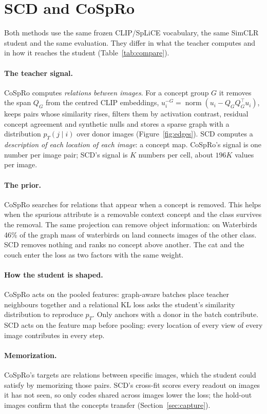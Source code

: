 \documentclass{article}
\begin{document}
\section{SCD and CoSpRo}
\label{sec:cospro}
Both methods use the same frozen CLIP/SpLiCE vocabulary, the same SimCLR student and the same evaluation. They differ in what the teacher computes and in how it reaches the student (Table~\ref{tab:compare}).

\paragraph{The teacher signal.} CoSpRo computes \emph{relations between images}. For a concept group $G$ it removes the span $Q_G$ from the centred CLIP embeddings, $u_i^{-G}=\operatorname{norm}(u_i-Q_GQ_G^\top u_i)$, keeps pairs whose similarity rises, filters them by activation contrast, residual concept agreement and synthetic nulls and stores a sparse graph with a distribution $p_T(j\mid i)$ over donor images (Figure~\ref{fig:edges}). SCD computes a \emph{description of each location of each image}: a concept map. CoSpRo's signal is one number per image pair; SCD's signal is $K$ numbers per cell, about $196K$ values per image.

\paragraph{The prior.} CoSpRo searches for relations that appear when a concept is removed. This helps when the spurious attribute is a removable context concept and the class survives the removal. The same projection can remove object information: on Waterbirds 46\% of the graph mass of waterbirds on land connects images of the other class. SCD removes nothing and ranks no concept above another. The cat and the couch enter the loss as two factors with the same weight.

\paragraph{How the student is shaped.} CoSpRo acts on the pooled features: graph-aware batches place teacher neighbours together and a relational KL loss asks the student's similarity distribution to reproduce $p_T$. Only anchors with a donor in the batch contribute. SCD acts on the feature map before pooling: every location of every view of every image contributes in every step.

\paragraph{Memorization.} CoSpRo's targets are relations between specific images, which the student could satisfy by memorizing those pairs. SCD's cross-fit scores every readout on images it has not seen, so only codes shared across images lower the loss; the hold-out images confirm that the concepts transfer (Section~\ref{sec:capture}).
\end{document}
